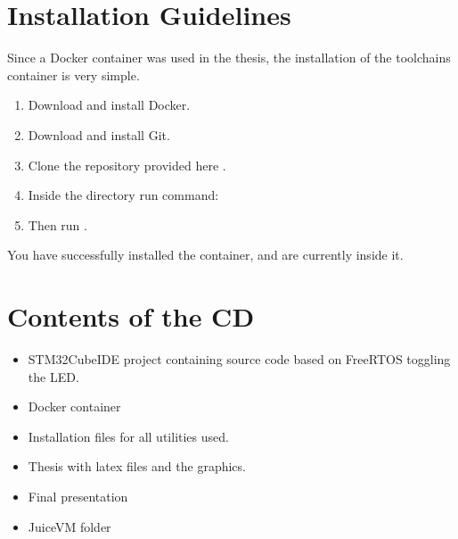 \appendix

\chapter{Installation Guidelines}

Since a Docker container was used in the thesis, the installation of the toolchains container is very simple. 

\begin{enumerate}
\item Download and install Docker.
\item Download and install Git.
\item Clone the repository provided here \cite{myba}.
\item Inside the directory run command: 
\item Then run .
\end{enumerate}

You have successfully installed the container, and are currently inside it.

\chapter{Contents of the CD}
\begin{itemize}
\item STM32CubeIDE project containing source code based on FreeRTOS toggling the LED.
\item Docker container
\item Installation files for all utilities used.
\item Thesis with latex files and the graphics.
\item Final presentation
\item JuiceVM folder
\end{itemize}
